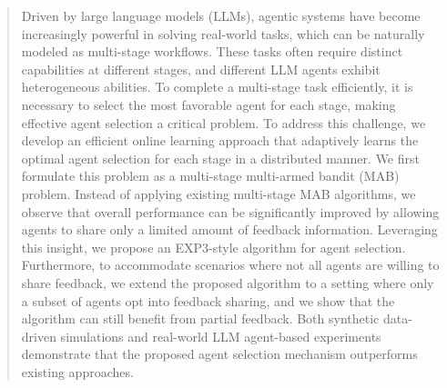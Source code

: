 \begin{abstract}

Driven by large language models (LLMs), agentic systems have become increasingly powerful in solving real-world tasks, which can be naturally modeled as multi-stage workflows. 
These tasks often require distinct capabilities at different stages, 
and different LLM agents exhibit heterogeneous abilities. 
To complete a multi-stage task efficiently, 
it is necessary to select the most favorable agent for each stage, making effective agent selection a critical problem.
To address this challenge, we develop an efficient online learning approach that adaptively learns the optimal agent selection for each stage in a distributed manner. 
We first formulate this problem as a multi-stage multi-armed bandit (MAB) problem. Instead of applying existing multi-stage MAB algorithms, 
we observe that overall performance can be significantly improved 
by allowing agents to share only a limited amount of feedback information. 
Leveraging this insight, we propose an EXP3-style algorithm for agent selection. Furthermore, to accommodate scenarios where not all agents are willing to share feedback, we extend the proposed algorithm to a setting where only a subset of agents opt into feedback sharing, and we show that the algorithm can still benefit from partial feedback.
Both synthetic data-driven simulations and real-world LLM agent-based experiments demonstrate that the proposed agent selection mechanism outperforms existing approaches.
\end{abstract}